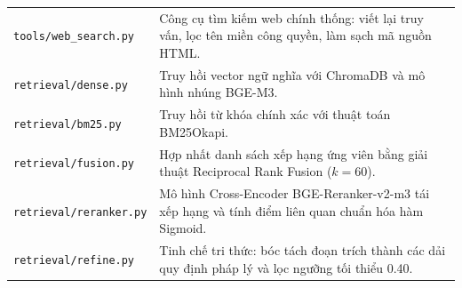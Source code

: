 \begin{table}[htbp]
\begin{tabularx}{\textwidth}{L{4.8cm} Y}
\texttt{tools/web\_search.py} & Công cụ tìm kiếm web chính thống: viết lại truy vấn, lọc tên miền công quyền, làm sạch mã nguồn HTML. \\
\texttt{retrieval/dense.py} & Truy hồi vector ngữ nghĩa với ChromaDB và mô hình nhúng BGE-M3. \\
\texttt{retrieval/bm25.py} & Truy hồi từ khóa chính xác với thuật toán BM25Okapi. \\
\texttt{retrieval/fusion.py} & Hợp nhất danh sách xếp hạng ứng viên bằng giải thuật Reciprocal Rank Fusion ($k=60$). \\
\texttt{retrieval/reranker.py} & Mô hình Cross-Encoder BGE-Reranker-v2-m3 tái xếp hạng và tính điểm liên quan chuẩn hóa hàm Sigmoid. \\
\texttt{retrieval/refine.py} & Tinh chế tri thức: bóc tách đoạn trích thành các dải quy định pháp lý và lọc ngưỡng tối thiểu 0.40. \\
\bottomrule
\end{tabularx}
\end{table}


